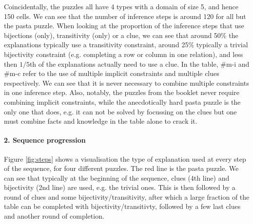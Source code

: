 Coincidentally, the puzzles all have 4 types with a domain of size 5, and hence 150 cells. We can see that the number of inference steps is around 120 for all but the pasta puzzle. When looking at the proportion of the inference steps that use bijections (only), transitivity (only) or a clue, we can see that around 50\% the explanations typically use a transitivity constraint, around 25\% typically a trivial bijectivity constraint (e.g. completing a row or column in one relation), and less then $1/5$th of the explanations actually need to use a clue.
In the table, \#m-i and \#m-c refer to the use of multiple implicit constraints and multiple clues respectively. We can see that it is never necessary to combine multiple constraints in one inference step. Also, notably, the puzzles from the booklet never require combining implicit constraints, while the anecdotically hard pasta puzzle is the only one that does, e.g. it can not be solved by focussing on the clues but one must combine facts and knowledge in the table alone to crack it.

\begin{table}
	\centering
\caption{Composition of puzzle explanations}
\label{table:composition}
\end{table}

\paragraph{2. Sequence progression}
Figure \ref{fig:steps} shows a visualisation the type of explanation used at every step of the sequence, for four different puzzles. The red line is the pasta puzzle. We can see that typically at the beginning of the sequence, clues (4th line) and bijectivity (2nd line) are used, e.g. the trivial ones. This is then followed by a round of clues and some bijectivity/transitivity, after which a large fraction of the table can be completed with bijectivity/transitivty, followed by a few last clues and another round of completion.

